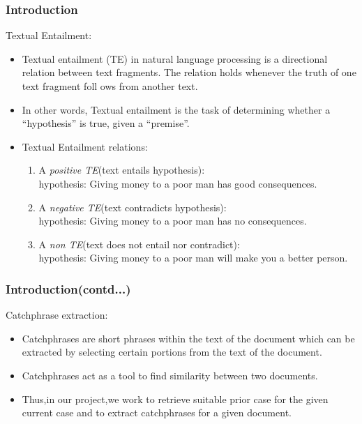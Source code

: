 \documentclass{beamer}
\begin{document}
\begin{frame}\frametitle{Introduction}
Textual Entailment:\\
\begin{itemize}

\item Textual entailment (TE) in natural language processing is a directional relation between text fragments. The relation holds whenever the truth of one text fragment foll																																																								ows from another text.
\item In other words, Textual entailment is the task of determining whether a “hypothesis” is true,
given a “premise”.
\item Textual Entailment relations:
\\ 
\begin{enumerate}
	\item A \textit{positive TE}(text entails hypothesis):
	\\ hypothesis: Giving money to a poor man has good consequences.
	\item A \textit{negative TE}(text contradicts hypothesis):
	\\ hypothesis: Giving money to a poor man has no consequences.
	\item A \textit{non TE}(text does not entail nor contradict):
	\\ hypothesis: Giving money to a poor man will make you a better person.
	
\end{enumerate}
 \end{itemize}
\end{frame}
\begin{frame}\frametitle{Introduction(contd...)}
Catchphrase extraction:\\
	\begin{itemize}		

\item Catchphrases are short phrases within the text of the document which can be extracted by selecting certain portions from the text of the document.
\item Catchphrases act as a tool to find similarity between two documents.
\item Thus,in our project,we work to retrieve suitable prior case for the given current case and to extract catchphrases for a given document.
 \end{itemize}
\end{frame}
\end{document}
